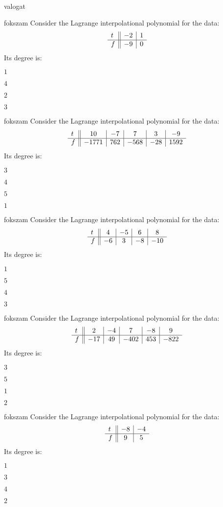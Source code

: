 \documentclass[12pt]{article}
\begin{document}
\begin{quiz}{valogat}
\begin{multi}{fokszam}
Consider the Lagrange interpolational polynomial for the data:
$$\begin{array}{l ||c|c}t&-2&1\\ \hline f&-9&0 \\ \end{array}$$
Its degree is:
\item* $ 1 $
\item  $ 4 $
\item  $ 2 $
\item  $ 3 $
\end{multi}
\begin{multi}{fokszam}
Consider the Lagrange interpolational polynomial for the data:
$$\begin{array}{l ||c|c|c|c|c}t&10&-7&7&3&-9\\ \hline f&-1771&762&-568&-28&1592 \\ \end{array}$$
Its degree is:
\item* $ 3 $
\item  $ 4 $
\item  $ 5 $
\item  $ 1 $
\end{multi}
\begin{multi}{fokszam}
Consider the Lagrange interpolational polynomial for the data:
$$\begin{array}{l ||c|c|c|c}t&4&-5&6&8\\ \hline f&-6&3&-8&-10 \\ \end{array}$$
Its degree is:
\item* $ 1 $
\item  $ 5 $
\item  $ 4 $
\item  $ 3 $
\end{multi}
\begin{multi}{fokszam}
Consider the Lagrange interpolational polynomial for the data:
$$\begin{array}{l ||c|c|c|c|c}t&2&-4&7&-8&9\\ \hline f&-17&49&-402&453&-822 \\ \end{array}$$
Its degree is:
\item* $ 3 $
\item  $ 5 $
\item  $ 1 $
\item  $ 2 $
\end{multi}
\begin{multi}{fokszam}
Consider the Lagrange interpolational polynomial for the data:
$$\begin{array}{l ||c|c}t&-8&-4\\ \hline f&9&5 \\ \end{array}$$
Its degree is:
\item* $ 1 $
\item  $ 3 $
\item  $ 4 $
\item  $ 2 $
\end{multi}
\end{quiz}
\end{document}
